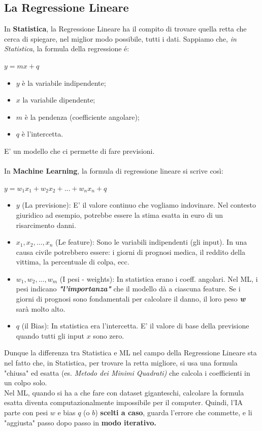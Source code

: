 \documentclass{article}
\begin{document}
\subsection{La Regressione Lineare}
In \textbf{Statistica}, la Regressione Lineare ha il compito di trovare quella retta che cerca di spiegare, nel miglior modo possibile, tutti i dati.
Sappiamo che, \textit{in Statistica}, la formula della regressione é:\\ \centerline{$y = mx+q$}
\begin{itemize}
    \item $y$ è la variabile indipendente;

    \item $x$ la variabile dipendente;

    \item $m$ è la pendenza (coefficiente angolare);

    \item $q$ è l'intercetta.
\end{itemize}
E' un modello che ci permette di fare previsioni.\\
\\
In \textbf{Machine Learning}, la formula di regressione lineare si scrive così:\\
\centerline{$y = w_1 x_1 + w_2x_2+...+w_nx_n + q$}

\begin{itemize}
    \item $y$ (La previsione): E' il valore continuo che vogliamo indovinare. Nel contesto giuridico ad esempio, potrebbe essere la stima esatta in euro di un risarcimento danni.

    \item $x_1,x_2,...,x_n$ (Le feature): Sono le variabili indipendenti (gli input). In una causa civile potrebbero essere: i giorni di prognosi medica, il reddito della vittima, la percentuale di colpa, ecc.

    \item $w_1,w_2,...,w_m$ (I pesi - weights): In statistica erano i coeff. angolari. Nel ML, i pesi indicano \textbf{\textit{"l'importanza"}} che il modello dà a ciascuna feature. Se i giorni di prognosi sono fondamentali per calcolare il danno, il loro peso \textbf{\textit{w}} sarà molto alto.

    \item $q$ (il Bias): In statistica era l'intercetta. E' il valore di base della previsione quando tutti gli input \textit{$x$} sono zero.
\end{itemize}
Dunque la differenza tra Statistica e ML nel campo della Regressione Lineare sta nel fatto che, in Statistica, per trovare la retta migliore, si usa una formula "chiusa" ed esatta (es. \textit{Metodo dei Minimi Quadrati)} che calcola i coefficienti in un colpo solo.\\
Nel ML, quando si ha a che fare con dataset giganteschi, calcolare la formula esatta diventa computazionalmente impossibile per il computer. Quindi, l'IA parte con pesi $w$ e bias $q$ (o $b$) \textbf{scelti a caso}, guarda l'errore che commette, e li "aggiusta" passo dopo passo in \textbf{modo iterativo.}
\end{document}
